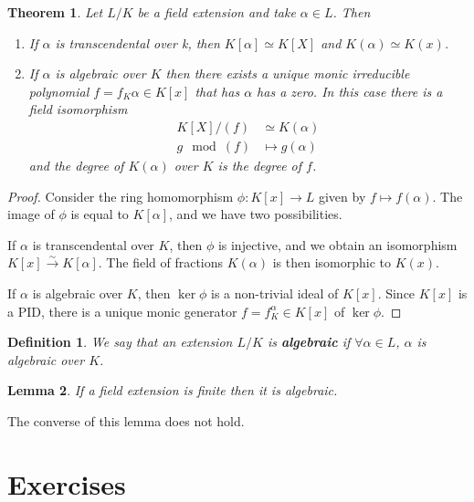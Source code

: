 \documentclass{article}
\newtheorem{theorem}{Theorem}[section]
\newtheorem{lemma}[theorem]{Lemma}
\newtheorem*{definition}{Definition}
\theoremstyle{remark}
\newenvironment{colbox}
    {\newcommand\colboxcolor{B6D0DE}%
    \begin{lrbox}{\selvestebox}%
    \begin{minipage}{\dimexpr\columnwidth-2\fboxsep\relax}}
    {\end{minipage}\end{lrbox}%
    \begin{center}
    \colorbox[HTML]{\colboxcolor}{\usebox{\selvestebox}}
    \end{center}}
\begin{document}
    \begin{colbox}
        \begin{theorem}
            Let $L/K$ be a field extension and take $\alpha\in L$. Then
            \begin{enumerate}
                \item If $\alpha$ is transcendental over k, then $K[\alpha]\simeq K[X]$ and $K(\alpha)\simeq K(x)$.
                \item If $\alpha$ is algebraic over $K$ then there exists a unique monic irreducible polynomial $f=f_K\alpha\in K[x]$ that has $\alpha$ has a zero.
                    In this case there is a field isomorphism
                    \begin{align*}
                        K[X]/(f)&\simeq K(\alpha)\\
                        g\mod (f)&\mapsto g(\alpha)
                    \end{align*}
                    and the degree of $K(\alpha)$ over $K$ is the degree of $f$.
            \end{enumerate}
        \end{theorem}
    \end{colbox}
    \begin{proof}
        Consider the ring homomorphism $\phi:K[x]\to L$ given by $f\mapsto f(\alpha)$.
        The image of $\phi$ is equal to $K[\alpha]$, and we have two possibilities.

        If $\alpha$ is transcendental over $K$, then $\phi$ is injective, and we obtain an isomorphism $K[x]\xrightarrow{\sim}K[\alpha]$.
        The field of fractions $K(\alpha)$ is then isomorphic to $K(x)$.

        If $\alpha$ is algebraic over $K$, then $\ker\phi$ is a non-trivial ideal of $K[x]$.
        Since $K[x]$ is a PID, there is a unique monic generator $f=f_K^\alpha\in K[x]$ of $\ker\phi$.
    \end{proof}

    \begin{definition}
        We say that an extension $L/K$ is \textbf{algebraic} if $\forall \alpha\in L$, $\alpha$ is algebraic over $K$.
    \end{definition}
    \begin{lemma}
        If a field extension is finite then it is algebraic.
    \end{lemma}
    The converse of this lemma does not hold.

    \newpage
    \section{Exercises}
    
\end{document}
